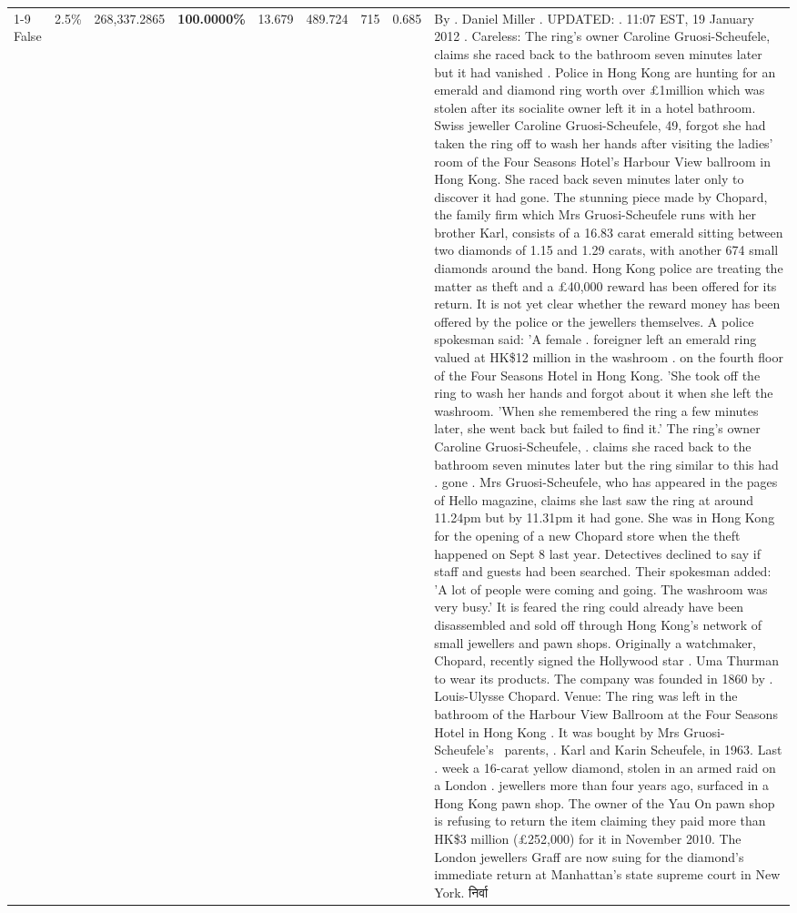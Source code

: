 \begin{table}[H]
\begin{tabular}{lllrlllll}
\cline{1-9}
False & 2.5\% & \color{red} 268,337.2865 & \bfseries \color{red} 100.0000\% & 13.679 & 489.724 & 715 & 0.685 & By . Daniel Miller . UPDATED: . 11:07 EST, 19 January 2012 . Careless: The ring's owner Caroline Gruosi-Scheufele, claims she raced back to the bathroom seven minutes later but it had vanished . Police in Hong Kong are hunting for an emerald and diamond ring worth over £1million which was stolen after its socialite owner left it in a hotel bathroom. Swiss jeweller Caroline Gruosi-Scheufele, 49, forgot she had taken the ring off to wash her hands after visiting the ladies' room of the Four Seasons Hotel's Harbour View ballroom in Hong Kong. She raced back seven minutes later only to discover it had gone. The stunning piece made by Chopard, the family firm which Mrs Gruosi-Scheufele runs with her brother Karl, consists of a 16.83 carat emerald sitting between two diamonds of 1.15 and 1.29 carats, with another 674 small diamonds around the band. Hong Kong police are treating the matter as theft and a £40,000 reward has been offered for its return. It is not yet clear whether the reward money has been offered by the police or the jewellers themselves. A police spokesman said: 'A female . foreigner left an emerald ring valued at HK\$12 million in the washroom . on the fourth floor of the Four Seasons Hotel in Hong Kong. 'She took off the ring to wash her hands and forgot about it when she left the washroom. 'When she remembered the ring a few minutes later, she went back but failed to find it.' The ring's owner Caroline Gruosi-Scheufele, . claims she raced back to the bathroom seven minutes later but the ring similar to this had . gone . Mrs Gruosi-Scheufele, who has appeared in the pages of Hello magazine, claims she last saw the ring at around 11.24pm but by 11.31pm it had gone. She was in Hong Kong for the opening of a new Chopard store when the theft happened on Sept 8 last year. Detectives declined to say if staff and guests had been searched. Their spokesman added: 'A lot of people were coming and going. The washroom was very busy.' It is feared the ring could already have been disassembled and sold off through Hong Kong's network of small jewellers and pawn shops. Originally a watchmaker, Chopard, recently signed the Hollywood star . Uma Thurman to wear its products. The company was founded in 1860 by . Louis-Ulysse Chopard. Venue: The ring was left in the bathroom of the Harbour View Ballroom at the Four Seasons Hotel in Hong Kong . It was bought by Mrs Gruosi-Scheufele's  parents, . Karl and Karin Scheufele, in 1963. Last . week a 16-carat yellow diamond, stolen in an armed raid on a London . jewellers more than four years ago, surfaced in a Hong Kong pawn shop. The owner of the Yau On pawn shop is refusing to return the item claiming they paid more than HK\$3 million (£252,000) for it in November 2010. The London jewellers Graff are now suing for the diamond’s immediate return at Manhattan’s state supreme court in New York. निर्वा \\

\end{tabular}
\end{table}
